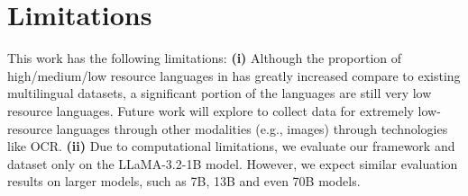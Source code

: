 \section*{Limitations}
\label{sec:limitation}
This work has the following limitations:
\textbf{(i)} Although the proportion of high/medium/low resource languages in \dcad has greatly increased compare to existing multilingual datasets, a significant portion of the languages are still very low resource languages. Future work will explore to collect data for extremely low-resource languages through other modalities (e.g., images) through technologies like OCR.
\textbf{(ii)} Due to computational limitations, we evaluate our framework and dataset only on the LLaMA-3.2-1B model. However, we expect similar evaluation results on larger models, such as 7B, 13B and even 70B models.
